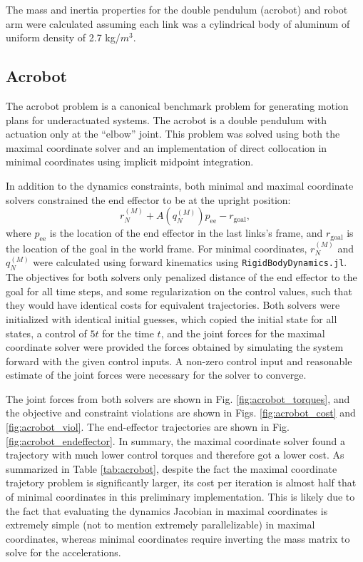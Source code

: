 \documentclass[../root.tex]{subfiles}
\begin{document}
The mass and inertia properties for the double pendulum (acrobot) and robot arm were 
calculated assuming each link was a cylindrical body of aluminum of uniform density of 
2.7 kg/$m^3$.

\subsection{Acrobot}
The acrobot problem is a canonical benchmark problem for generating motion plans for 
underactuated systems. The acrobot is a double pendulum with actuation only at the ``elbow''
joint. This problem was solved using both the maximal coordinate solver and an implementation
of direct collocation in minimal coordinates using implicit midpoint integration.

In addition to the dynamics constraints, both minimal and maximal coordinate solvers 
constrained the end effector to be at the upright position:
\begin{equation}
    r_N^{(M)} + A(q_N^{(M)}) p_\text{ee} - r_\text{goal},
\end{equation}
where $p_\text{ee}$ is the location of the end effector in the last links's frame, and
$r_\text{goal}$ is the location of the goal in the world frame.
For minimal coordinates, $r_N^{(M)}$ and $q_N^{(M)}$ were calculated using forward 
kinematics using \texttt{RigidBodyDynamics.jl}. The objectives for both solvers only 
penalized distance of the end effector to the goal for all time steps, and some 
regularization on the control values, such that they would have identical costs for 
equivalent trajectories. Both solvers were initialized with identical 
initial guesses, which copied the initial state for all states, a control of $5 t$ for 
the time $t$, and the joint forces for the maximal coordinate solver were provided the forces 
obtained by simulating the system forward with the given control inputs. A non-zero control 
input and reasonable estimate of the joint forces were necessary for the solver to converge.

The joint forces from both solvers are shown in Fig. \ref{fig:acrobot_torques}, and the 
objective and constraint violations are shown in Figs. \ref{fig:acrobot_cost} and 
\ref{fig:acrobot_viol}. The end-effector trajectories are shown in Fig. 
\ref{fig:acrobot_endeffector}. In summary, the maximal coordinate solver found a trajectory 
with much lower control torques and therefore got a lower cost. As summarized in Table 
\ref{tab:acrobot}, despite the fact the maximal coordinate trajetory problem is significantly
larger, its cost per iteration is almost half that of minimal coordinates in this 
preliminary implementation. This is likely due to the fact that evaluating the dynamics Jacobian
in maximal coordinates is extremely simple (not to mention extremely parallelizable) in 
maximal coordinates, whereas minimal coordinates require inverting the mass matrix to solve 
for the accelerations. 
\end{document}
